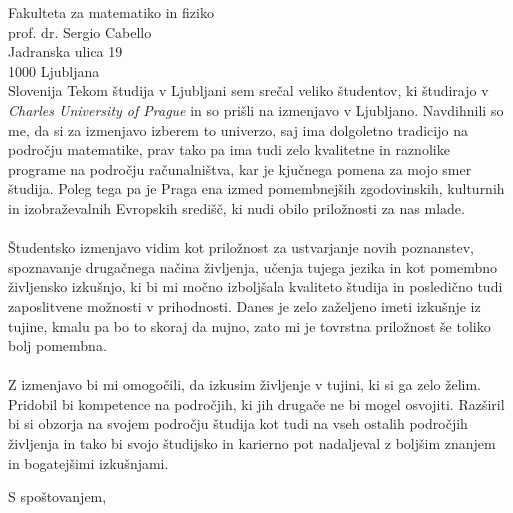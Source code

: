 \documentclass[a4paper]{scrlttr2}
\begin{document}
\begin{letter}{Fakulteta za matematiko in fiziko\\ prof. dr. Sergio Cabello \\ Jadranska ulica 19 \\ 1000 Ljubljana \\ Slovenija}
Tekom študija v Ljubljani sem srečal veliko študentov, ki študirajo v \textit{Charles University of Prague} in so prišli na izmenjavo v Ljubljano. Navdihnili so me, da si za izmenjavo izberem to univerzo, saj ima dolgoletno tradicijo na področju matematike, prav tako pa ima tudi zelo kvalitetne in raznolike programe na področju računalništva, kar je kjučnega pomena za mojo smer študija. Poleg tega pa je Praga ena izmed pomembnejših zgodovinskih, kulturnih in izobraževalnih Evropskih središč, ki nudi obilo priložnosti za nas mlade.
\\
\\
Študentsko izmenjavo vidim kot priložnost za ustvarjanje novih poznanstev, spoznavanje drugačnega načina življenja, učenja tujega jezika in kot pomembno življensko izkušnjo, ki bi mi močno izboljšala kvaliteto študija in posledično tudi zaposlitvene možnosti v prihodnosti. Danes je zelo zaželjeno imeti izkušnje iz tujine, kmalu pa bo to skoraj da nujno, zato mi je tovrstna priložnost še toliko bolj pomembna.
\\
\\
Z izmenjavo bi mi omogočili, da izkusim življenje v tujini, ki si ga zelo želim. Pridobil bi kompetence na področjih, ki jih drugače ne bi mogel osvojiti. Razširil bi si obzorja na svojem področju študija kot tudi na vseh ostalih področjih življenja in tako bi svojo študijsko in karierno pot nadaljeval z boljšim znanjem in bogatejšimi izkušnjami. 





\closing{S spoštovanjem,}

\newpage





 
\end{letter}
 
\end{document}
